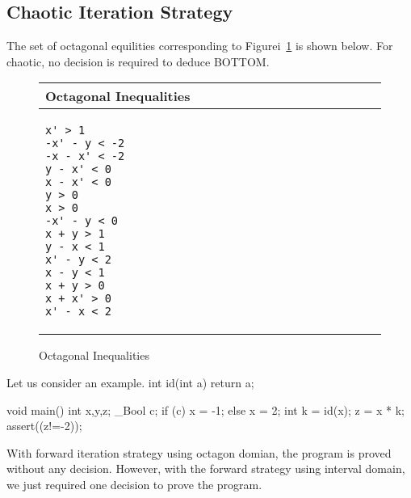 \subsection{Chaotic Iteration Strategy}  
The set of octagonal equilities corresponding to Figurei~\ref{sw-ssa}
is shown below. For chaotic, no decision is required to deduce BOTTOM.
\begin{figure}[t]
\scriptsize
\begin{tabular}{l}
\hline
Octagonal Inequalities \\
\hline
\begin{lstlisting}
x' > 1                                                                      
-x' - y < -2                                                               
-x - x' < -2                                                               
y - x' < 0                                                                 
x - x' < 0                                                                 
y > 0                                                                       
x > 0                                                                       
-x' - y < 0                                                                
x + y > 1                                                                 
y - x < 1                                                                 
x' - y < 2                                                                 
x - y < 1                                                                 
x + y > 0                                                                 
x + x' > 0                                                                 
x' - x < 2  
\end{lstlisting}
\\
\hline
\end{tabular}
\caption{Octagonal Inequalities}
\label{sw-ssa}
\end{figure}


Let us consider an example. 
int id(int a)
{
  return a;
}

void main() {
 int x,y,z;
 \_Bool c;
 if (c)
   x = -1;
 else
   x = 2;
 int k = id(x);
 z = x * k;
 assert((z!=-2));
}

With forward iteration strategy using octagon domian, the program 
is proved without any decision. However, with the forward strategy
using interval domain, we just required one decision to prove the program. 
